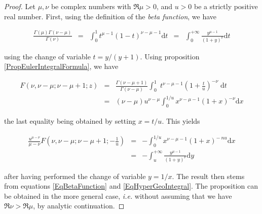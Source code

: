 \documentclass{jams-l}
\theoremstyle{definition}
\theoremstyle{remark}
\numberwithin{equation}{section}
\begin{document}
            \begin{proof}
        
                Let $\mu, \nu$ be complex numbers with $\Re \mu > 0$, and $u > 0$ be a strictly positive real number. First, using the definition of the \textit{beta function}, we have
            
                \begin{equation}
                \label{EqBetaFunction}
                    \begin{array}{lllll}
                        \frac{\Gamma \left( \mu \right) \Gamma \left( \nu - \mu \right)}{\Gamma \left( \nu \right)} & = & \int_0^1 t^{\mu - 1} \left( 1 - t \right)^{\nu - \mu - 1} \mathrm{d}t & = & \int_0^{+ \infty} \frac{y^{\mu - 1}}{\left( 1 + y \right)^{\nu}} \mathrm{d}t
                    \end{array}
                \end{equation}
            
                \noindent using the change of variable $t = y/\left( y+1 \right)$. Using proposition \ref{PropEulerIntegralFormula}, we have
            
                \[ \begin{array}{lll}
                        F \left( \nu, \nu - \mu; \nu - \mu + 1; z \right) & = & \frac{\Gamma \left( \nu - \mu + 1 \right)}{\Gamma \left( \nu - \mu \right)} \int_0^1 \; t^{\nu - \mu -1} \left( 1 + \frac{t}{u} \right)^{- \nu} \; \mathrm{d}t \\[1em]
                    
                        & = & \left( \nu - \mu \right) u^{\nu - \mu} \int_0^{1/u} x^{\nu - \mu - 1} \left( 1 + x \right)^{-\nu} \mathrm{d}x
                    \end{array} \]
            
                \noindent the last equality being obtained by setting $x=t/u$. This yields
            
                \begin{equation}
                \label{EqHyperGeoIntegral}
                    \begin{array}{lll}
                        \frac{u^{\mu - \nu}}{\mu - \nu} F \left( \nu, \nu - \mu; \nu - \mu + 1; - \frac{1}{u} \right) & = & - \int_0^{1/u} x^{\nu - \mu - 1} \left( 1 + x \right)^{-\ nu} \mathrm{d}x \\[1em]
                    
                        & = & - \int_u^{+ \infty} \frac{y^{\mu - 1}}{\left( 1 + y \right)^{\nu}} \mathrm{d}y
                    \end{array}
                \end{equation}
                
                \noindent after having performed the change of variable $y = 1/x$. The result then stems from equations \eqref{EqBetaFunction} and \eqref{EqHyperGeoIntegral}. The proposition can be obtained in the more general case, \textit{i.e.} without assuming that we have $\Re \nu > \Re \mu$, by analytic continuation.
        
            \end{proof}
            
\end{document}
